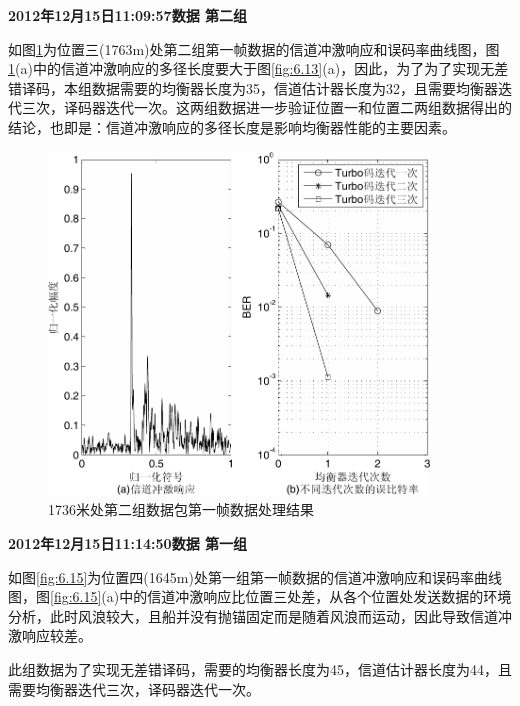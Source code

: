 \textbf{\sihao 2012年12月15日11:09:57数据 第二组} 

如图\ref{fig:6.14}为位置三(1763m)处第二组第一帧数据的信道冲激响应和误码率曲线图，图\ref{fig:6.14}(a)中的信道冲激响应的多径长度要大于图\ref{fig:6.13}(a)，因此，为了为了实现无差错译码，本组数据需要的均衡器长度为35，信道估计器长度为32，且需要均衡器迭代三次，译码器迭代一次。这两组数据进一步验证位置一和位置二两组数据得出的结论，也即是：信道冲激响应的多径长度是影响均衡器性能的主要因素。

\begin{figure}[htb]
  \begin{center}
    \includegraphics[width=0.9\textwidth]{images/result_3_2.pdf}
  \end{center}
  \caption{1736米处第二组数据包第一帧数据处理结果}
  \label{fig:6.14}
\end{figure}

\textbf{\sihao 2012年12月15日11:14:50数据 第一组} 

如图\ref{fig:6.15}为位置四(1645m)处第一组第一帧数据的信道冲激响应和误码率曲线图，图\ref{fig:6.15}(a)中的信道冲激响应比位置三处差，从各个位置处发送数据的环境分析，此时风浪较大，且船并没有抛锚固定而是随着风浪而运动，因此导致信道冲激响应较差。

此组数据为了实现无差错译码，需要的均衡器长度为45，信道估计器长度为44，且需要均衡器迭代三次，译码器迭代一次。

